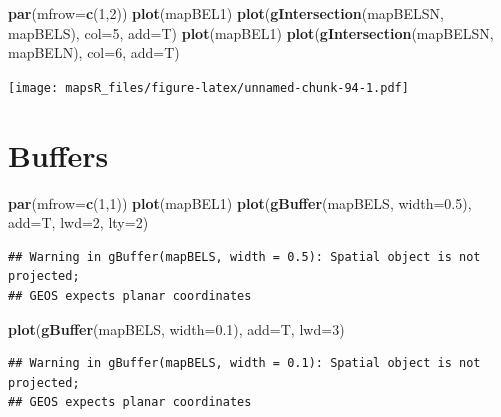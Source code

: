 \documentclass[]{report}
\newenvironment{Shaded}{\begin{snugshade}}{\end{snugshade}}
\newcommand{\KeywordTok}[1]{\textcolor[rgb]{0.13,0.29,0.53}{\textbf{{#1}}}}
\newcommand{\DataTypeTok}[1]{\textcolor[rgb]{0.13,0.29,0.53}{{#1}}}
\newcommand{\DecValTok}[1]{\textcolor[rgb]{0.00,0.00,0.81}{{#1}}}
\newcommand{\FloatTok}[1]{\textcolor[rgb]{0.00,0.00,0.81}{{#1}}}
\newcommand{\NormalTok}[1]{{#1}}
\begin{document}
\begin{Shaded}
\begin{Highlighting}[]
\KeywordTok{par}\NormalTok{(}\DataTypeTok{mfrow=}\KeywordTok{c}\NormalTok{(}\DecValTok{1}\NormalTok{,}\DecValTok{2}\NormalTok{))}
\KeywordTok{plot}\NormalTok{(mapBEL1)}
\KeywordTok{plot}\NormalTok{(}\KeywordTok{gIntersection}\NormalTok{(mapBELSN, mapBELS), }\DataTypeTok{col=}\DecValTok{5}\NormalTok{, }\DataTypeTok{add=}\NormalTok{T)}
\KeywordTok{plot}\NormalTok{(mapBEL1)}
\KeywordTok{plot}\NormalTok{(}\KeywordTok{gIntersection}\NormalTok{(mapBELSN, mapBELN), }\DataTypeTok{col=}\DecValTok{6}\NormalTok{, }\DataTypeTok{add=}\NormalTok{T)}
\end{Highlighting}
\end{Shaded}

\texttt{[image: mapsR\_files/figure-latex/unnamed-chunk-94-1.pdf]}

\section{Buffers}\label{buffers}

\begin{Shaded}
\begin{Highlighting}[]
\KeywordTok{par}\NormalTok{(}\DataTypeTok{mfrow=}\KeywordTok{c}\NormalTok{(}\DecValTok{1}\NormalTok{,}\DecValTok{1}\NormalTok{))}
\KeywordTok{plot}\NormalTok{(mapBEL1)}
\KeywordTok{plot}\NormalTok{(}\KeywordTok{gBuffer}\NormalTok{(mapBELS, }\DataTypeTok{width=}\FloatTok{0.5}\NormalTok{), }\DataTypeTok{add=}\NormalTok{T, }\DataTypeTok{lwd=}\DecValTok{2}\NormalTok{, }\DataTypeTok{lty=}\DecValTok{2}\NormalTok{)}
\end{Highlighting}
\end{Shaded}

\begin{verbatim}
## Warning in gBuffer(mapBELS, width = 0.5): Spatial object is not projected;
## GEOS expects planar coordinates
\end{verbatim}

\begin{Shaded}
\begin{Highlighting}[]
\KeywordTok{plot}\NormalTok{(}\KeywordTok{gBuffer}\NormalTok{(mapBELS, }\DataTypeTok{width=}\FloatTok{0.1}\NormalTok{), }\DataTypeTok{add=}\NormalTok{T, }\DataTypeTok{lwd=}\DecValTok{3}\NormalTok{)}
\end{Highlighting}
\end{Shaded}

\begin{verbatim}
## Warning in gBuffer(mapBELS, width = 0.1): Spatial object is not projected;
## GEOS expects planar coordinates
\end{verbatim}
\end{document}
